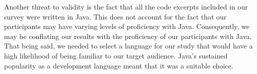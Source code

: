\par Another threat to validity is the fact that all the code
excerpts included in our survey were written in Java.
This does not account for the fact that our participants may have varying
levels of proficiency with Java.
Consequently, we may be conflating our results with the proficiency of our
participants with Java.
That being said, we needed to select a language for our study that would
have a high likelihood of being familiar to our target audience.
Java's sustained popularity as a development language meant that it was a 
suitable choice.

\endinput

TODO: I need a citation for how popular Java is. Tiobe could work; ask Gail?

